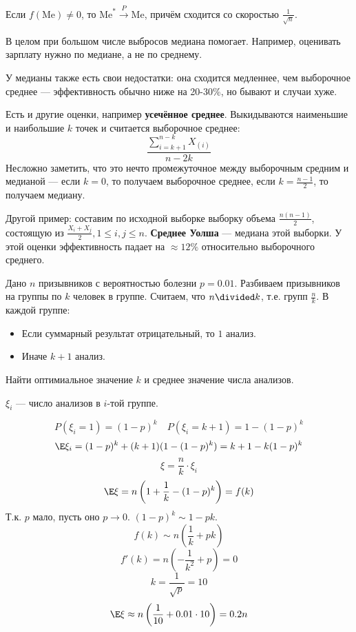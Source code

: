 \begin{theorem}
    Если \(f(\mathrm{Me}) \neq 0\), то \(\mathrm{Me}^* \xrightarrow{P} \mathrm{Me}\), причём сходится со скоростью \(\frac{1}{\sqrt{n}}\).
\end{theorem}

В целом при большом числе выбросов медиана помогает. Например, оценивать зарплату нужно по медиане, а не по среднему.

У медианы также есть свои недостатки: она сходится медленнее, чем выборочное среднее --- эффективность обычно ниже на 20-30\%, но бывают и случаи хуже.

Есть и другие оценки, например \textbf{усечённое среднее}. Выкидываются наименьшие и наибольшие \(k\) точек и считается выборочное среднее:
\[\frac{\sum\limits_{i= k + 1}^{n - k} X_{(i)}}{n - 2k}\]
Несложно заметить, что это нечто промежуточное между выборочным средним и медианой --- если \(k = 0\), то получаем выборочное среднее, если \(k = \frac{n - 1}{2}\), то получаем медиану.

Другой пример: составим по исходной выборке выборку объема \(\frac{n(n - 1)}{2}\), состоящую из \(\frac{X_i + X_j}{2}, 1 \leq i,j \leq n\). \textbf{Среднее Уолша} --- медиана этой выборки. У этой оценки эффективность падает на \(\approx 12\%\) относительно выборочного среднего.

\begin{exercise}
    Дано \(n\) призывников с вероятностью болезни \(p = 0.01\). Разбиваем призывников на группы по \(k\) человек в группе. Считаем, что \(n \divided k\), т.е. групп \(\frac{n}{k}\). В каждой группе:
    \begin{itemize}
        \item Если суммарный результат отрицательный, то \(1\) анализ.
        \item Иначе \(k + 1\) анализ.
    \end{itemize}

    Найти оптимиальное значение \(k\) и среднее значение числа анализов.
\end{exercise}
\begin{solution}
    \(\xi_i\) --- число анализов в \(i\)-той группе.

    \[P(\xi_i = 1) = (1 - p)^k \quad P(\xi_i = k + 1) = 1 - (1 - p)^k\]
    \[\E \xi_i = (1 - p)^k + (k + 1)(1 - (1 - p)^k) = k + 1 - k(1 - p)^k\]
    \[\xi = \frac{n}{k} \cdot \xi_i\]
    \[\E \xi = n\left(1 + \frac{1}{k} - (1 - p)^k\right) = f(k)\]
    Т.к. \(p\) мало, пусть оно \(p \to 0\). \((1 - p)^k \sim 1 - pk\).
    \[f(k) \sim n \left(\frac{1}{k} + pk\right)\]
    \[f'(k) = n \left( - \frac{1}{k^2} + p \right) = 0\]
    \[k = \frac{1}{\sqrt{p}} = 10\]
    \[\E \xi \approx n \left(\frac{1}{10} + 0.01 \cdot 10\right) = 0.2 n\]
\end{solution}
